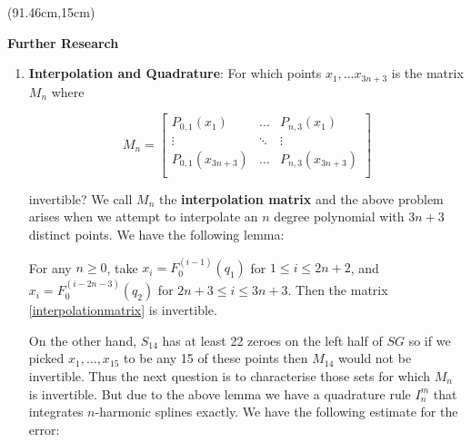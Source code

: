 \documentclass[a0, landscape]{a0poster}
\begin{document}
{%
\begin{textblock*}{10.75in}(91.46cm,15cm)%
    \begin{minipage}{10.75in} 
    \begin{center}
            {\LARGE \textcolor{CornellRed}{\textbf{Further Research}}}
        \end{center}
        \vspace{1cm}
        \begin{enumerate}
        \item \textbf{Interpolation and Quadrature}: For which points $x_1, \ldots x_{3n+3}$ is the matrix $M_n$ where
        
	$$ M_n = \begin{bmatrix}
    P_{0,1}(x_1) & \ldots & P_{n,3}(x_1) \\
    \vdots & \ddots & \vdots \\
    P_{0,1}(x_{3n+3}) & \ldots & P_{n,3}(x_{3n+3})\\
    \end{bmatrix}$$
        
        invertible? We call $M_n$ the \textbf{interpolation matrix} and the above problem arises when we attempt to interpolate an $n$ degree polynomial with $3n + 3$ distinct points. We have the following lemma: 
\begin{lemma*}
For any $n\ge 0$, take $x_i=F_0^{(i-1)}(q_1)$ for $1\le i\le 2n+2$, and $x_i=F_0^{(i-2n-3)}(q_2)$ for $2n+3\le i \le 3n+3$. Then the matrix \eqref{interpolationmatrix} is invertible.
\end{lemma*}
        
On the other hand, $S_{14}$ has at least 22 zeroes on the left half of $SG$ so if we picked $x_1, \ldots, x_{15}$ to be any 15 of these points then $M_{14}$ would not be invertible. Thus the next question is to characterise those sets for which $M_n$ is invertible. But due to the above lemma we have a quadrature rule $I^{m}_{n}$ that integrates $n$-harmonic splines exactly. We have the following estimate for the error: 
        

\end{enumerate}
\end{minipage}
\end{textblock*}}
\end{document}
